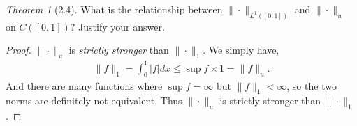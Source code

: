 \documentclass[12pt]{article}
\theoremstyle{remark}
\theoremstyle{named}
\newtheorem*{theorem}{Theorem}
\begin{document}
\begin{theorem}[2.4]
    What is the relationship between \(\|\cdot\|_{L^1([0, 1])}\) and \(\|\cdot\|_u\) on \(C([0, 1])\)? Justify your answer.
\end{theorem}

\begin{proof}
    \(\|\cdot\|_u\) is \textit{strictly stronger} than \(\|\cdot\|_1\). We simply have,
    \begin{align*}
        \|f\|_1 = \int_{0}^{1} |f| dx \leq \sup f \times 1 = \|f\|_u.
    \end{align*}
    And there are many functions where \(\sup f = \infty\) but \(\|f\|_1 < \infty\), so the two norms are definitely not equivalent. Thus \(\|\cdot\|_u\) is strictly stronger than \(\|\cdot\|_1\).
\end{proof}
\end{document}
